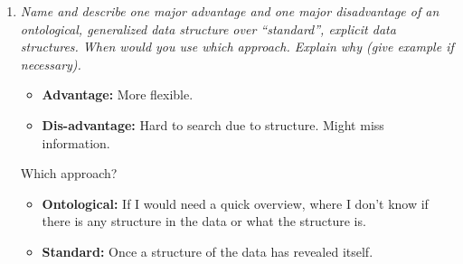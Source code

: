 \documentclass[a4paper,10pt,titlepage]{article}
\begin{document}
\begin{enumerate}
\begin{enumerate}
\end{enumerate}

\item
\textit{Name and describe one major advantage and one major disadvantage of an ontological, generalized data structure over “standard”, explicit data structures. When would you use which approach. Explain why (give example if necessary).}\\

\begin{itemize}
\item
\textbf{Advantage:} More flexible.

\item
\textbf{Dis-advantage:} Hard to search due to structure. Might miss information.
\end{itemize}
Which approach?
\begin{itemize}
\item
\textbf{Ontological:} If I would need a quick overview, where I don't know if there is any structure in the data or what the structure is.
\item
\textbf{Standard:} Once a structure of the data has revealed itself.
\end{itemize}
\end{enumerate}
\end{document}
